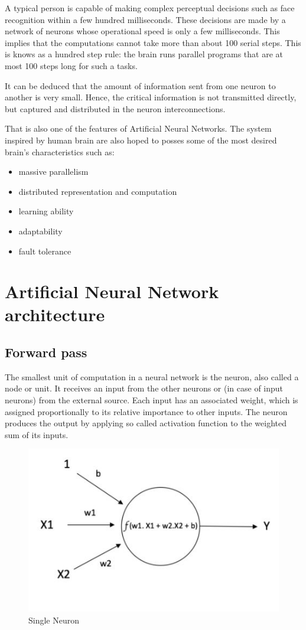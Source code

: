 A typical person is capable of making complex perceptual decisions such as face recognition within a few hundred milliseconds. These decisions are made by a network of neurons whose operational speed is only a few milliseconds. This implies that the computations cannot take more than about 100 serial steps. This is knows as a hundred step rule: the brain runs parallel programs that are at most 100 steps long for such a tasks.

It can be deduced that the amount of information sent from one neuron to another is very small. Hence, the critical information is not transmitted directly, but captured and distributed in the neuron interconnections. 

That is also one of the features of Artificial Neural Networks. The system inspired by human brain are also hoped to posses some of the most desired brain's characteristics such as:

\begin{itemize}
\itemsep0em 
\item massive parallelism 
\item distributed representation and computation
\item learning ability 
\item adaptability
\item fault tolerance
\end{itemize}


\section{Artificial Neural Network architecture}

\subsection{Forward pass}

The smallest unit of computation in a neural network is the neuron, also called a node or unit. It receives an input from the other neurons or (in case of input neurons) from the external source. Each input has an associated weight, which is assigned proportionally to its relative importance to other inputs. The neuron produces the output by applying so called activation function to the weighted sum of its inputs.

\begin{figure}[H]
\centering
\includegraphics[scale=0.65]{single_neuron.jpg}
\caption{Single Neuron}
\end{figure} 


